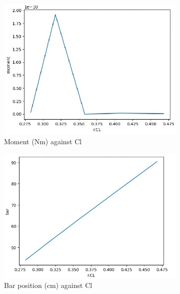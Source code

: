 \begin{figure}[H]
  \begin{subfigure}{0.5\textwidth}
    \includegraphics[width=\textwidth]{figures/Optimization/3D/moment equilibre.png}
    \caption{Moment (Nm) against Cl}
  \end{subfigure}
  \begin{subfigure}{0.5\textwidth}
    \includegraphics[width=\textwidth]{figures/Optimization/3D/moment equilibre bar.png}
    \caption{Bar position (cm) against Cl}
  \end{subfigure}
  \begin{subfigure}{0.5\textwidth}

\end{subfigure}
\end{figure}
